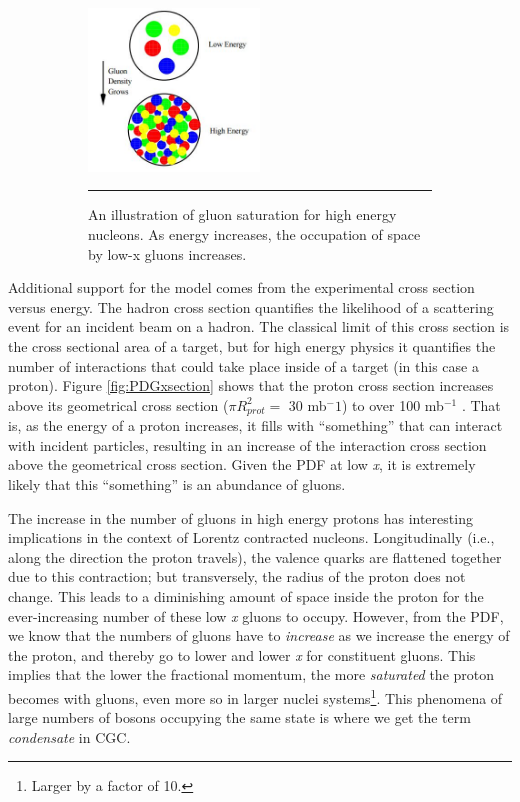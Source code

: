 \begin{figure}
\centering
\ContinuedFloat
\begin{subfigure}[h]{0.8\textwidth}
  \centering
    \includegraphics[width=0.5\textwidth]{Figures/gluondensityCGC.jpg}
  \caption[Illustration of gluon saturation in Color-Glass Condensate.]{An illustration of gluon saturation for high energy nucleons\citep{McLerran:2001sr}. As energy increases, the occupation of space by low-x gluons increases.}
  \label{fig:gluonsaturation}
    \rule{35em}{0.5pt}
\end{subfigure}
\caption{}
\end{figure}

Additional support for the model comes from the experimental cross section versus energy. The hadron cross section quantifies the likelihood of a scattering event for an incident beam on a hadron. The classical limit of this cross section is the cross sectional area of a target, but for high energy physics it quantifies the number of interactions that could take place inside of a target (in this case a proton). Figure \ref{fig:PDGxsection} shows that the proton cross section increases above its geometrical cross section ($\pi R_{prot}^2 =$ 30 mb${^-1}$) to over 100 mb$^{-1}$ \citep{PDGcrosssection}\citep{Itakura2012}. That is, as the energy of a proton increases, it fills with ``something'' that can interact with incident particles, resulting in an increase of the interaction cross section above the geometrical cross section. Given the PDF at low \textit{x}, it is extremely likely that this ``something'' is an abundance of gluons.

The increase in the number of gluons in high energy protons has interesting implications in the context of Lorentz contracted nucleons. Longitudinally (i.e., along the direction the proton travels), the valence quarks are flattened together due to this contraction; but transversely, the radius of the proton does not change. This leads to a diminishing amount of space inside the proton for the ever-increasing number of these low \textit{x} gluons to occupy. However, from the PDF, we know that the numbers of gluons have to \textit{increase} as we increase the energy of the proton, and thereby go to lower and lower \textit{x} for constituent gluons. This implies that the lower the fractional momentum, the more \textit{saturated} the proton becomes with gluons, even more so in larger nuclei systems\footnote{Larger by a factor of 10.}. This phenomena of large numbers of bosons occupying the same state is where we get the term \textit{condensate} in CGC.

